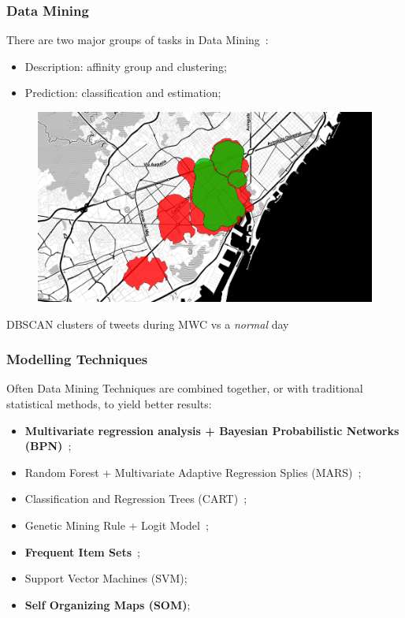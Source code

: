 \documentclass[hyperref={pdfpagelabels=true}]{beamer}
\begin{document}
\begin{frame}
\frametitle{Data Mining}
There are two major groups of tasks in Data Mining~\cite{sets}:
\begin{itemize}
\item Description: affinity group and clustering;
\item Prediction: classification and estimation;
\end{itemize}
\begin{figure}
\includegraphics[scale=0.35]{mwc_nonmwc_1000_0125.png}
\end{figure}
\tiny{DBSCAN clusters of tweets during MWC vs a \textit{normal} day}
\end{frame}

\begin{frame}
\frametitle{Modelling Techniques}
Often Data Mining Techniques are combined together, or with traditional statistical methods, to yield better results:
\begin{itemize}
\item \textbf{Multivariate regression analysis + Bayesian Probabilistic Networks (BPN)}~\cite{bayesian};
\item Random Forest + Multivariate Adaptive Regression Splies (MARS)~\cite{mars};
\item Classification and Regression Trees (CART)~\cite{cart};
\item Genetic Mining Rule + Logit Model~\cite{gmr};
\item \textbf{Frequent Item Sets}~\cite{sets};
\item Support Vector Machines (SVM); 
\item \textbf{Self Organizing Maps (SOM)};
\end{itemize}
\end{frame}
\end{document}
